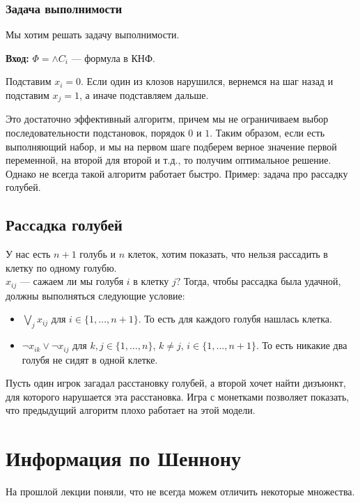 \subsection{Задача выполнимости}
Мы хотим решать задачу выполнимости.

\textbf{Вход:} $ \Phi = \wedge C_i $  --- формула в КНФ.

Подставим $ x_i = 0$. Если один из клозов нарушился, вернемся на шаг назад и подставим $  x_j = 1$, а иначе подставляем дальше.

\begin{figure}[ht]
    \centering
    \label{fig:cnf-algo}
\end{figure}

Это достаточно эффективный алгоритм, причем мы не ограничиваем выбор последовательности подстановок, порядок $ 0$ и $ 1$. Таким образом, если есть выполняющий набор, и мы на первом шаге подберем верное значение первой переменной, на второй для второй и т.д., то получим оптимальное решение. Однако не всегда такой алгоритм работает быстро. Пример: задача про рассадку голубей.

\section{Раcсадка голубей}
\begin{figure}[ht]
    \centering
    \label{fig:golub-img}
\end{figure}
У нас есть $n+1$ голубь и $n$ клеток, хотим показать, что нельзя рассадить в клетку по одному голубю.\\
$x_{ij}$ --- сажаем ли мы голубя $i$ в клетку $j$?
Тогда, чтобы рассадка была удачной, должны выполняться следующие условие: 
\begin{itemize}
    \item $\bigvee\limits_{j} x_{ij}$ для $i \in \{1, \dots, n+1\}$. То есть для каждого голубя нашлась клетка.
    \item $\neg x_{ik} \vee \neg x_{ij}$ для $k, j \in \{1, \dots , n \}$, $k \neq j$, $i \in \{1, \dots, n+1\}$. То есть никакие два голубя не сидят в одной клетке.
\end{itemize}
Пусть один игрок загадал расстановку голубей, а второй хочет найти дизъюнкт, для которого нарушается эта расстановка. Игра с монетками позволяет показать, что предыдущий алгоритм плохо работает на этой модели.


\chapter{Информация по Шеннону}
На прошлой лекции поняли, что не всегда можем отличить некоторые множества.

